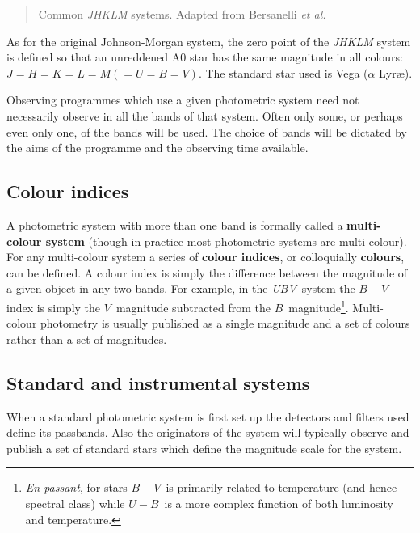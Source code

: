 \documentclass[twoside,11pt]{article}
\begin{document}
\begin{description}
\begin{table}[htbp]
  \begin{quote}
  \caption[Common {\it JHKLM} systems]{Common
   {\it JHKLM} systems.  Adapted from Bersanelli {\it
   et al.}\/\cite{BERSANELLI91}
  \label{IRSYS} }
  \end{quote}

  \end{table}

   As for the original Johnson-Morgan system, the zero point of the
   {\it JHKLM} system is defined so that an unreddened A0 star has the
   same magnitude in all colours: $J = H = K = L = M (= U = B = V)$.
   The standard star used is Vega ($\alpha$ Lyr\ae ).

\end{description}

Observing programmes which use a given photometric system need not
necessarily observe in all the bands of that system.  Often only some,
or perhaps even only one, of the bands will be used.  The choice of bands
will be dictated by the aims of the programme and the observing time
available.

\subsection{Colour indices}

A photometric system with more than one band is formally called a
{\bf multi-colour system} (though in practice most photometric systems
are multi-colour).  For any multi-colour system a series of {\bf
colour indices}, or colloquially {\bf colours}, can be defined.  A
colour index is simply the difference between the magnitude of a given
object in any two bands.  For example, in the {\it UBV}\, system the
$B - V$\, index is simply the $V$\, magnitude subtracted from the $B$\,
magnitude\footnote{{\it En passant}, for stars $B - V$\, is primarily
related to temperature (and hence spectral class) while $U - B$\, is a
more complex function of both luminosity and temperature.}.  Multi-colour
photometry is usually published as a single magnitude and a set of
colours rather than a set of magnitudes.

\subsection{Standard and instrumental systems}

When a standard photometric system is first set up the detectors and
filters used define its passbands.  Also the originators of the system
will typically observe and publish a set of standard stars which
define the magnitude scale for the system.
\end{document}
